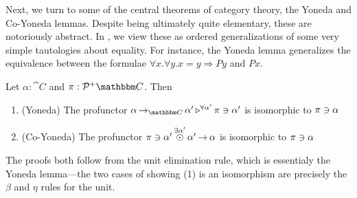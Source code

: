 \documentclass{llncs}
\begin{document}
Next, we turn to some of the central theorems of category theory, the
Yoneda and Co-Yoneda lemmas. Despite being ultimately quite
elementary, these are notoriously abstract. In \ohol{}, we view
these as ordered generalizations of some very simple tautologies about
equality. For instance, the Yoneda lemma generalizes the equivalence
between the formulae $\forall x. \forall y. x = y \Rightarrow P y$ and
$P x$.
\begin{lemma} \label{lem:yoneda}
  Let $\alpha : \cat C$ and $\pi : \posPresheaf {\cat C}$. Then
  \begin{enumerate}
  \item (Yoneda) The profunctor 
    $\homrallXYtoZ {\alpha'} {\punitinXfromYtoZ {\cat C} {\alpha}{\alpha'}} {\posPresheafAppPtoX \pi {\alpha'}}$ is isomorphic to $\pi \ni \alpha$
  \item (Co-Yoneda) The profunctor $\pi \ni \alpha' \mathop{\overset{\exists \alpha'}\odot} \alpha' \mathop{\to_{}} \alpha$ is isomorphic to $\pi \ni \alpha$
  \end{enumerate}
\end{lemma}
The proofs both follow from the unit elimination rule, which is
essentialy the Yoneda lemma---the two cases of showing (1) is an
isomorphism are precisely the $\beta$ and $\eta$ rules for the unit.
\end{document}
